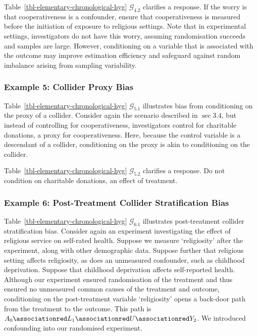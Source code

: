 \documentclass[
  single column]{article}
\begin{document}
Table~\ref{tbl-elementary-chronological-hyg} \(\mathcal{G}_{4.2}\)
clarifies a response. If the worry is that cooperativeness is a
confounder, ensure that cooperativeness is measured before the
initiation of exposure to religious settings. Note that in experimental
settings, investigators do not have this worry, assuming randomisation
succeeds and samples are large. However, conditioning on a variable that
is associated with the outcome may improve estimation efficiency and
safeguard against random imbalance arising from sampling variability.

\subsubsection{Example 5: Collider Proxy
Bias}\label{example-5-collider-proxy-bias}

Table~\ref{tbl-elementary-chronological-hyg} \(\mathcal{G}_{5.1}\)
illustrates bias from conditioning on the proxy of a collider. Consider
again the scenario described in \(\sec 3.4\), but instead of controlling
for cooperativeness, investigators control for charitable donations, a
proxy for cooperativeness. Here, because the control variable is a
descendant of a collider, conditioning on the proxy is akin to
conditioning on the collider.

Table~\ref{tbl-elementary-chronological-hyg} \(\mathcal{G}_{5.2}\)
clarifies a response. Do not condition on charitable donations, an
effect of treatment.

\subsubsection{Example 6: Post-Treatment Collider Stratification
Bias}\label{example-6-post-treatment-collider-stratification-bias}

Table~\ref{tbl-elementary-chronological-hyg} \(\mathcal{G}_{6.1}\)
illustrates post-treatment collider stratification bias. Consider again
an experiment investigating the effect of religious service on
self-rated health. Suppose we measure `religiosity' after the
experiment, along with other demographic data. Suppose further that
religious setting affects religiosity, as does an unmeasured confounder,
such as childhood deprivation. Suppose that childhood deprivation
affects self-reported health. Although our experiment ensured
randomisation of the treatment and thus ensured no unmeasured common
causes of the treatment and outcome, conditioning on the post-treatment
variable `religiosity' opens a back-door path from the treatment to the
outcome. This path is
\(A_0 \associationred L_1 \associationred U \associationred Y_2\). We
introduced confounding into our randomised experiment.
\end{document}
